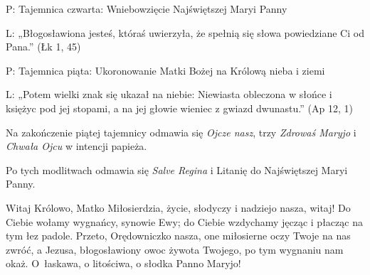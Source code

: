 ﻿\documentclass[9pt,twoside]{extarticle}
\begin{document}
{\hnr P:} Tajemnica czwarta: Wniebowzięcie Najświętszej Maryi Panny


{\hnr L:} „Błogosławiona jesteś, któraś uwierzyła, że spełnią się słowa powiedziane Ci od Pana.” (Łk 1, 45)


{\hnr P:} Tajemnica piąta: Ukoronowanie Matki Bożej na Królową nieba i ziemi


{\hnr L:} „Potem wielki znak się ukazał na niebie: Niewiasta obleczona w słońce
i księżyc pod jej stopami, a na jej głowie wieniec z gwiazd dwunastu.” (Ap 12, 1)


{\hnr Na zakończenie piątej tajemnicy odmawia się {\em Ojcze nasz}, trzy {\em Zdrowaś Maryjo} i {\em Chwała Ojcu} w intencji papieża. 


Po tych modlitwach odmawia się {\em Salve Regina} i Litanię do Najświętszej Maryi Panny.}


{\hnr{}}


Witaj Królowo, Matko Miłosierdzia, życie, słodyczy i nadziejo nasza, witaj! Do Ciebie wołamy wygnańcy, synowie Ewy; do Ciebie wzdychamy jęcząc i płacząc na tym łez padole. Przeto, Orędowniczko nasza, one miłosierne oczy Twoje na nas zwróć, a Jezusa, błogosławiony owoc żywota Twojego, po tym wygnaniu nam okaż. O~łaskawa, o litościwa, o słodka Panno Maryjo!


{\hnr{}}
\end{document}

